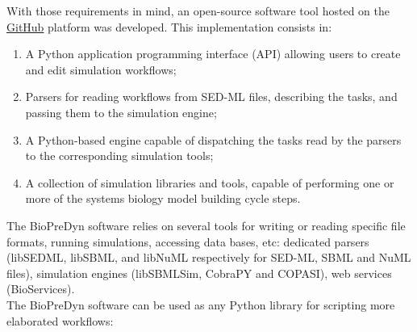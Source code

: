 \documentclass{llncs}
\begin{document}
With those requirements in mind, an open-source software tool hosted on the
\href{http://www.github.com/bmoreau/biopredyn}{GitHub} platform was developed.
This implementation consists in:
\begin{enumerate}
\item A Python application programming interface (API) allowing users to
create and edit simulation workflows;
\item Parsers for reading workflows from SED-ML files, describing the tasks,
and passing them to the simulation engine;
\item A Python-based engine capable of dispatching the tasks read by the parsers
to the corresponding simulation tools;
\item A collection of simulation libraries and tools, capable of performing one
or more of the systems biology model building cycle steps.
\end{enumerate}
The BioPreDyn software relies on several tools for writing or reading specific
file formats, running simulations, accessing data bases, etc: dedicated parsers
(libSEDML, libSBML, and libNuML respectively for SED-ML, SBML and NuML files),
simulation engines (libSBMLSim\cite{Takizawa2013}, CobraPY\cite{Ebrahim2013}
and COPASI\cite{Hoops2006}), web services (BioServices\cite{Cokelaer2013}).\\

The BioPreDyn software can be used as any Python library for scripting more
elaborated workflows:

{}

\end{document}
